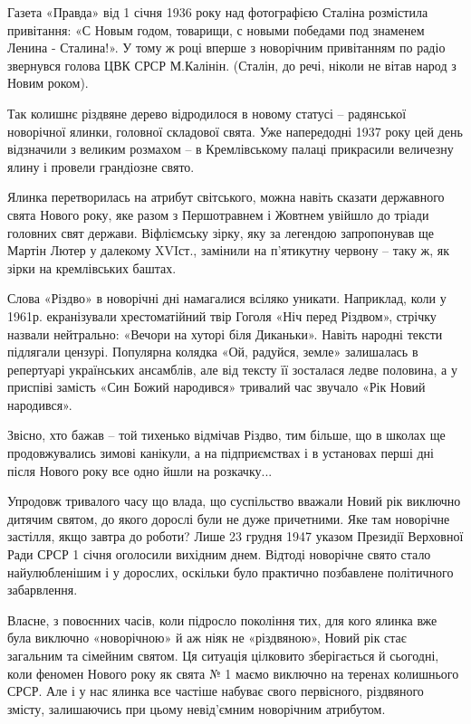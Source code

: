 Газета «Правда» від 1 січня 1936 року над фотографією Сталіна розмістила
привітання: «С Новым годом, товарищи, с новыми победами под знаменем Ленина -
Сталина!». У тому ж році вперше з новорічним привітанням по радіо звернувся
голова ЦВК СРСР М.Калінін. (Сталін, до речі, ніколи не вітав народ з Новим
роком).

Так колишнє різдвяне дерево відродилося в новому статусі – радянської
новорічної ялинки, головної складової свята. Уже напередодні 1937 року цей день
відзначили з великим розмахом – в Кремлівському палаці прикрасили величезну
ялину і провели грандіозне свято.

Ялинка перетворилась на атрибут світського, можна навіть сказати державного
свята Нового року, яке разом з Першотравнем і Жовтнем увійшло до тріади
головних свят держави. Віфліємську зірку, яку за легендою запропонував ще
Мартін Лютер у далекому XVIст., замінили на п’ятикутну червону – таку ж, як
зірки на кремлівських баштах. 

Слова «Різдво» в новорічні дні намагалися всіляко уникати. Наприклад, коли у
1961р. екранізували хрестоматійний твір Гоголя «Ніч перед Різдвом», стрічку
назвали нейтрально: «Вечори на хуторі біля Диканьки». Навіть народні тексти
підлягали цензурі. Популярна колядка «Ой, радуйся, земле» залишалась в
репертуарі українських ансамблів, але від тексту її зосталася ледве половина, а
у приспіві замість «Син Божий народився» тривалий час звучало «Рік Новий
народився». 

Звісно, хто бажав – той тихенько відмічав Різдво, тим більше, що в школах ще
продовжувались зимові канікули, а на підприємствах і в установах перші дні
після Нового року все одно йшли на розкачку...

Упродовж тривалого часу що влада, що суспільство вважали Новий рік виключно
дитячим святом, до якого дорослі були не дуже причетними. Яке там новорічне
застілля, якщо завтра до роботи? Лише 23 грудня 1947 указом Президії Верховної
Ради СРСР 1 січня оголосили вихідним днем. Відтоді новорічне свято стало
найулюбленішим і у дорослих, оскільки було практично позбавлене політичного
забарвлення.

Власне, з повоєнних часів, коли підросло покоління тих, для кого  ялинка вже
була виключно «новорічною» й аж ніяк не «різдвяною», Новий рік стає загальним
та сімейним святом. Ця ситуація цілковито зберігається й сьогодні, коли феномен
Нового року як свята № 1 маємо виключно на теренах колишнього СРСР. Але і у нас
ялинка все частіше набуває свого первісного, різдвяного змісту, залишаючись при
цьому невід’ємним новорічним атрибутом.
